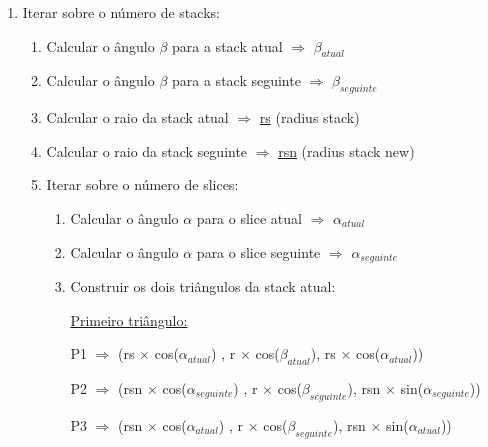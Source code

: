 \documentclass[a4paper]{article}
\begin{document}
\ttfamily
\begin{enumerate}
  \item Iterar sobre o número de stacks:
  \begin{enumerate}
    \item Calcular o ângulo $\beta$ para a stack atual $\Rightarrow$ \underline{$\beta_{atual}$}
    \item Calcular o ângulo $\beta$ para a stack seguinte $\Rightarrow$ \underline{$\beta_{seguinte}$}
    \item Calcular o raio da stack atual $\Rightarrow$ \underline{rs} (radius stack)
    \item Calcular o raio da stack seguinte $\Rightarrow$ \underline{rsn} (radius stack new)

    \item Iterar sobre o número de slices:
    \begin{enumerate}
      \item Calcular o ângulo $\alpha$ para o slice atual $\Rightarrow$ \underline{$\alpha_{atual}$}
      \item Calcular o ângulo $\alpha$ para o slice seguinte $\Rightarrow$ \underline{$\alpha_{seguinte}$}
      \item Construir os dois triângulos da stack atual:

      \vspace{0.5cm}

      \underline{Primeiro triângulo:}

      \vspace{0.5cm}

          \hspace{0.0cm} P1 $\Rightarrow$ (rs $\times$ cos($\alpha_{atual}$) , r $\times$ cos($\beta_{atual}$), rs $\times$ cos($\alpha_{atual}$))

      \vspace{0.2cm}

          \hspace{-0.5cm} P2 $\Rightarrow$ (rsn $\times$ cos($\alpha_{seguinte}$) , r $\times$ cos($\beta_{seguinte}$), rsn $\times$ sin($\alpha_{seguinte}$))

      \vspace{0.2cm}

          \hspace{0.0cm} P3 $\Rightarrow$ (rsn $\times$ cos($\alpha_{atual}$) , r $\times$ cos($\beta_{seguinte}$), rsn $\times$ sin($\alpha_{atual}$))

      \vspace{0.5cm}


\end{enumerate}
\end{enumerate}
\end{enumerate}
\end{document}
